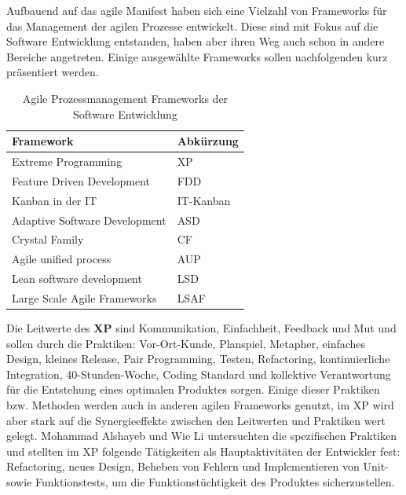 Aufbauend auf das agile Manifest haben sich eine Vielzahl von Frameworks für das Management der agilen Prozesse entwickelt. 
Diese sind mit Fokus auf die Software Entwicklung entstanden, haben aber ihren Weg auch schon in andere Bereiche angetreten. 
Einige ausgewählte Frameworks sollen nachfolgenden kurz präsentiert werden. 
\newline
\begin{table}[h!]
    \centering
    \caption{Agile Prozessmanagement Frameworks der Software Entwicklung}
    \label{tab:agile-frameworks}
    \begin{tabular}{|l|l|}
    \hline
    \textbf{Framework}            & \textbf{Abkürzung} \\ \hline
    Extreme Programming           & XP                 \\ \hline
    Feature Driven Development    & FDD                \\ \hline
    Kanban in der IT              & IT-Kanban          \\ \hline
    Adaptive Software Development & ASD                \\ \hline
    Crystal Family                & CF                 \\ \hline
    Agile unified process         & AUP                \\ \hline
    Lean software development     & LSD                \\ \hline
    Large Scale Agile Frameworks  & LSAF               \\ \hline
    \end{tabular}
\end{table} 
\newline
Die Leitwerte des \textbf{XP} sind Kommunikation, Einfachheit, Feedback und Mut und sollen durch die Praktiken:
Vor-Ort-Kunde, Planspiel, Metapher, einfaches Design, kleines Release, Pair Programming, Testen, Refactoring, 
kontinuierliche Integration, 40-Stunden-Woche, Coding Standard und kollektive Verantwortung für die Entstehung 
eines optimalen Produktes sorgen. Einige dieser Praktiken bzw. Methoden werden auch in anderen agilen Frameworks 
genutzt, im XP wird aber stark auf die Synergieeffekte zwischen den Leitwerten und Praktiken wert gelegt. \cite{FOJTIK20111464}
\newline Mohammad Alshayeb und Wie Li untersuchten die spezifischen Praktiken und stellten im XP folgende Tätigkeiten
als Hauptaktivitäten der Entwickler fest: Refactoring, neues Design, Beheben von Fehlern und Implementieren von Unit- 
sowie Funktionstests, um die Funktionstüchtigkeit des Produktes sicherzustellen. \cite{Alshayeb2006-nt}
